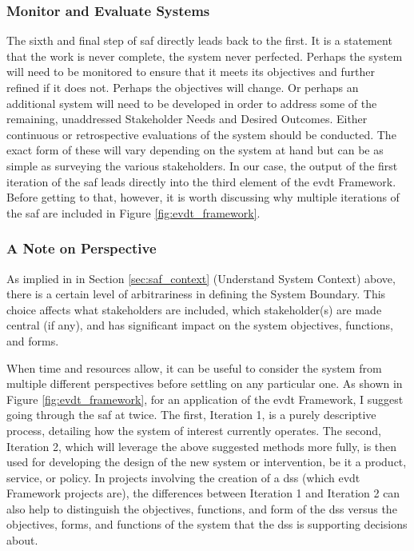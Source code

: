 


\subsubsection{Monitor and Evaluate Systems}

The sixth and final step of \ac{saf} directly leads back to the first. It is a statement that the work is never complete, the system never perfected. Perhaps the system will need to be monitored to ensure that it meets its objectives and further refined if it does not. Perhaps the objectives will change. Or perhaps an additional system will need to be developed in order to address some of the remaining, unaddressed Stakeholder Needs and Desired Outcomes. Either continuous or retrospective evaluations of the system should be conducted. The exact form of these will vary depending on the system at hand but can be as simple as surveying the various stakeholders. In our case, the output of the first iteration of the \ac{saf} leads directly into the third element of the \ac{evdt} Framework. Before getting to that, however, it is worth discussing why multiple iterations of the \ac{saf} are included in Figure \ref{fig:evdt_framework}.

\subsubsection{A Note on Perspective} \label{sec:perspective}

As implied in in Section \ref{sec:saf_context} (Understand System Context) above, there is a certain level of arbitrariness in defining the System Boundary. This choice affects what stakeholders are included, which stakeholder(s) are made central (if any), and has significant impact on the system objectives, functions, and forms.

When time and resources allow, it can be useful to consider the system from multiple different perspectives before settling on any particular one. As shown in Figure \ref{fig:evdt_framework}, for an application of the \ac{evdt} Framework, I suggest going through the \ac{saf} at twice. The first, Iteration 1, is a purely descriptive process, detailing how the system of interest currently operates.  The second, Iteration 2, which will leverage the above suggested methods more fully, is then used for developing the design of the new system or intervention, be it a product, service, or policy. In projects involving the creation of a \ac{dss} (which \ac{evdt} Framework projects are), the differences between Iteration 1 and Iteration 2 can also help to distinguish the objectives, functions, and form of the \ac{dss} versus the objectives, forms, and functions of the system that the \ac{dss} is supporting decisions about.

